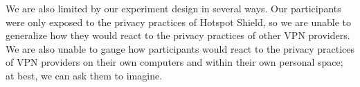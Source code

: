 We are also limited by our experiment design in several ways.
Our participants were only exposed to the privacy practices of Hotspot Shield, so we are unable to generalize how they would react to the privacy practices of other VPN providers.
We are also unable to gauge how participants would react to the privacy practices of VPN providers on their own computers and within their own personal space; at best, we can ask them to imagine.